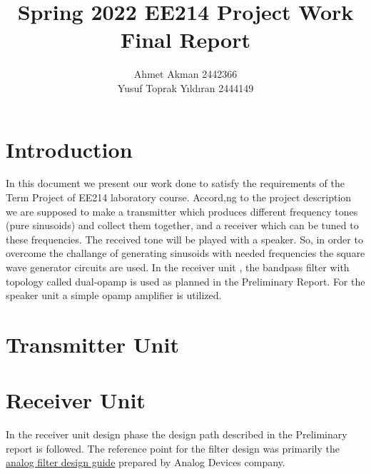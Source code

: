 \documentclass[letterpaper,12pt]{article}
\begin{document}
\thispagestyle{empty}

\title{ \vspace{-2cm} Spring 2022 EE214 Project Work  \protect\\ Final Report\vspace{-4mm}}
\author{ Ahmet Akman 2442366 \protect\\ Yusuf Toprak Yıldıran 2444149 }
\date{}
\maketitle
\section{Introduction}
In this document we present our work done to satisfy the requirements of the Term Project of EE214 laboratory course. Accord,ng to the project description we are supposed to make a transmitter which produces different frequency tones (pure sinusoids) and collect them together, and a receiver which can be tuned to these frequencies. The received tone will be played with a speaker.
So, in order to overcome the challange of generating sinusoids with needed frequencies the square wave generator circuits are used. In the receiver unit , the bandpass filter with topology called dual-opamp is used as planned in the Preliminary Report. For the speaker unit a simple opamp amplifier is utilized. 

\section{Transmitter Unit}
\section{Receiver Unit}
In the receiver unit design phase the design path described in the Preliminary report is followed. The reference point for the filter design was primarily the \href{https://www.analog.com/media/en/training-seminars/design-handbooks/basic-linear-design/chapter8.pdf}{analog filter design guide} prepared by Analog Devices company.
\end{document}
